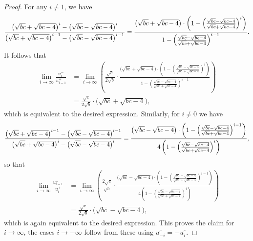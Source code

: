 \documentclass[pdflatex,sn-mathphys]{sn-jnl}%
\theoremstyle{thmstyleone}%
\theoremstyle{thmstyletwo}%
\theoremstyle{thmstylethree}%
\begin{document}
\begin{proof}
    For any $i\ne1$, we have
    \[\scalebox{0.95}{$\displaystyle\frac{\big(\sqrt{bc}+\sqrt{bc-4}\big)^i-\big(\sqrt{bc}-\sqrt{bc-4}\big)^i}{\big(\sqrt{bc}+\sqrt{bc-4}\big)^{i-1}-\big(\sqrt{bc}-\sqrt{bc-4}\big)^{i-1}}=\frac{\big(\sqrt{bc}+\sqrt{bc-4}\big)\cdot\left(1-\left(\frac{\sqrt{bc}-\sqrt{bc-4}}{\sqrt{bc}+\sqrt{bc-4}}\right)^i\right)}{1-\left(\frac{\sqrt{bc}-\sqrt{bc-4}}{\sqrt{bc}+\sqrt{bc-4}}\right)^{i-1}}$.}\]
    It follows that
    \begin{align*}
      \lim_{i\to\infty} \frac{u_i^-}{u_{i-1}^+}
      &=\lim_{i\to\infty} \left( \frac{\sqrt{c}}{2\sqrt{b}}\cdot\frac{\big(\sqrt{bc}+\sqrt{bc-4}\big)\cdot\left(1-\left(\frac{\sqrt{bc}-\sqrt{bc-4}}{\sqrt{bc}+\sqrt{bc-4}}\right)^i\right)}{1-\left(\frac{\sqrt{bc}-\sqrt{bc-4}}{\sqrt{bc}+\sqrt{bc-4}}\right)^{i-1}} \right)\\
      &=\frac{\sqrt{c}}{2\sqrt{b}}\cdot\big(\sqrt{bc}+\sqrt{bc-4}\big),
    \end{align*}
    which is equivalent to the desired expression.
    Similarly, for $i\ne0$ we have
    \[\scalebox{0.925}{$\displaystyle\frac{\big(\sqrt{bc}+\sqrt{bc-4}\big)^{i-1}-\big(\sqrt{bc}-\sqrt{bc-4}\big)^{i-1}}{\big(\sqrt{bc}+\sqrt{bc-4}\big)^i-\big(\sqrt{bc}-\sqrt{bc-4}\big)^i}=\frac{\big(\sqrt{bc}-\sqrt{bc-4}\big)\cdot\left(1-\left(\frac{\sqrt{bc}-\sqrt{bc-4}}{\sqrt{bc}+\sqrt{bc-4}}\right)^{i-1}\right)}{4\left(1-\left(\frac{\sqrt{bc}-\sqrt{bc-4}}{\sqrt{bc}+\sqrt{bc-4}}\right)^i\right)}$,}\]
    so that
    \begin{align*}
      \lim_{i\to\infty} \frac{u_{i-1}^-}{u_i^+}
      &=\lim_{i\to\infty} \left( \frac{2\sqrt{c}}{\sqrt{b}}\cdot\frac{\big(\sqrt{bc}-\sqrt{bc-4}\big)\cdot\left(1-\left(\frac{\sqrt{bc}-\sqrt{bc-4}}{\sqrt{bc}+\sqrt{bc-4}}\right)^{i-1}\right)}{4\left(1-\left(\frac{\sqrt{bc}-\sqrt{bc-4}}{\sqrt{bc}+\sqrt{bc-4}}\right)^i\right)} \right)\\
      &=\frac{\sqrt{c}}{2\sqrt{b}}\cdot\big(\sqrt{bc}-\sqrt{bc-4}\big),
    \end{align*}
    which is again equivalent to the desired expression.
    This proves the claim for $i\to\infty$, the cases $i\to-\infty$ follow from these using $u_{-i}^\varepsilon=-u_i^\varepsilon$.


\end{proof}
\end{document}
